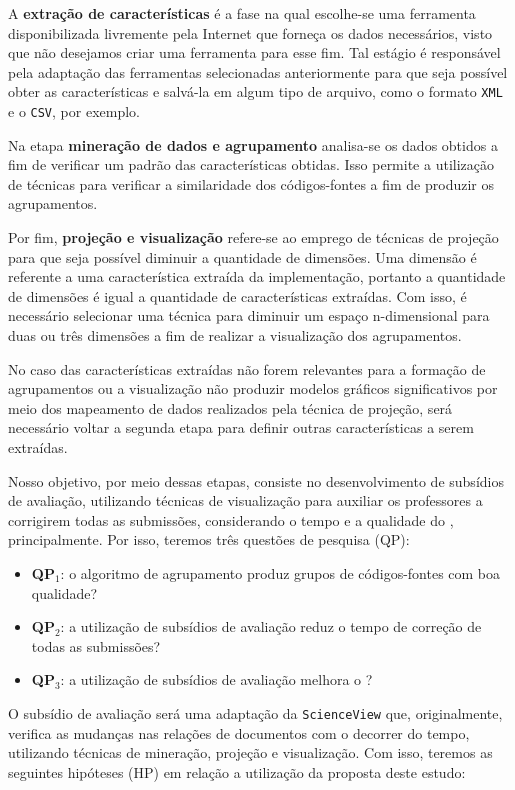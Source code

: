A \textbf{extração de características} é a fase na qual escolhe-se uma ferramenta
disponibilizada livremente pela Internet que forneça os dados necessários, visto
que não desejamos criar uma ferramenta para esse fim. Tal estágio é responsável pela
adaptação das ferramentas selecionadas anteriormente para que seja possível obter
as características e salvá-la em algum tipo de arquivo, como o formato \texttt{XML}
e o \texttt{CSV}, por exemplo.

Na etapa \textbf{mineração de dados e agrupamento} analisa-se os dados obtidos a
fim de verificar um padrão das características obtidas. Isso permite a utilização
de técnicas para verificar a similaridade dos códigos-fontes a fim
de produzir os agrupamentos.

Por fim, \textbf{projeção e visualização} refere-se ao emprego de técnicas de
projeção para que seja possível diminuir a quantidade de dimensões. Uma dimensão
é referente a uma característica extraída da implementação, portanto a quantidade
de dimensões é igual a quantidade de características extraídas. Com isso, é
necessário selecionar uma técnica para diminuir um espaço n-dimensional para
duas ou três dimensões a fim de realizar a visualização dos agrupamentos.

No caso das características extraídas não forem relevantes para a formação de
agrupamentos ou a visualização não produzir modelos gráficos significativos por
meio dos mapeamento de dados realizados pela técnica de projeção, será necessário
voltar a segunda etapa para definir outras características a serem extraídas.

Nosso objetivo, por meio dessas etapas, consiste no desenvolvimento de subsídios
de avaliação, utilizando técnicas de visualização para auxiliar os professores a
corrigirem todas as submissões, considerando o tempo e a qualidade do ,
principalmente. Por isso, teremos três questões de pesquisa (QP):

\begin{itemize}
	\item \textbf{QP$_1$}: o algoritmo de agrupamento produz grupos de códigos-fontes
	com boa qualidade?
	\item \textbf{QP$_2$}: a utilização de subsídios de avaliação reduz o tempo
	de correção de todas as submissões?
	\item \textbf{QP$_3$}: a utilização de subsídios de avaliação melhora o ?
\end{itemize}

O subsídio de avaliação será uma adaptação da \texttt{ScienceView} \cite{Alencar-etal:2012}
que, originalmente, verifica as mudanças nas relações de documentos com o decorrer do tempo,
utilizando técnicas de mineração, projeção e visualização. Com isso, teremos as
seguintes hipóteses (HP) em relação a utilização da proposta deste estudo:

